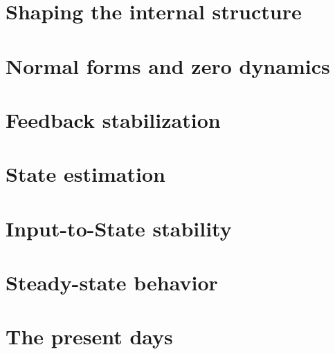 \documentclass{article}
\begin{document}
\section{Shaping the internal structure}
\section{Normal forms and zero dynamics}
\section{Feedback stabilization}
\section{State estimation}
\section{Input-to-State stability}
\section{Steady-state behavior}
\section{The present days}
\end{document}
